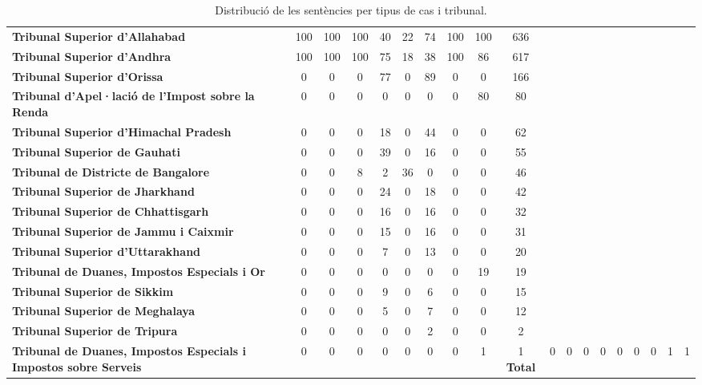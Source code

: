 \begin{table}[H]
\begin{tabular}{l|cccccccc|c}
    \textbf{Tribunal Superior d'Allahabad}                    & 100  & 100  & 100  & 40   & 22   & 74   & 100  & 100  & 636  \\
    \textbf{Tribunal Superior d'Andhra}                       & 100  & 100  & 100  & 75   & 18   & 38   & 100  & 86   & 617  \\
    \textbf{Tribunal Superior d'Orissa}                       & 0    & 0    & 0    & 77   & 0    & 89   & 0    & 0    & 166  \\
    \textbf{Tribunal d'Apel·lació de l'Impost sobre la Renda}           & 0    & 0    & 0    & 0    & 0    & 0    & 0    & 80   & 80   \\
    \textbf{Tribunal Superior d'Himachal Pradesh}             & 0    & 0    & 0    & 18   & 0    & 44   & 0    & 0    & 62   \\
    \textbf{Tribunal Superior de Gauhati}                      & 0    & 0    & 0    & 39   & 0    & 16   & 0    & 0    & 55   \\
    \textbf{Tribunal de Districte de Bangalore}                & 0    & 0    & 8    & 2    & 36   & 0    & 0    & 0    & 46   \\
    \textbf{Tribunal Superior de Jharkhand}                    & 0    & 0    & 0    & 24   & 0    & 18   & 0    & 0    & 42   \\
    \textbf{Tribunal Superior de Chhattisgarh}                  & 0    & 0    & 0    & 16   & 0    & 16   & 0    & 0    & 32   \\
    \textbf{Tribunal Superior de Jammu i Caixmir}             & 0    & 0    & 0    & 15   & 0    & 16   & 0    & 0    & 31   \\
    \textbf{Tribunal Superior d'Uttarakhand}                  & 0    & 0    & 0    & 7    & 0    & 13   & 0    & 0    & 20   \\
    \textbf{Tribunal de Duanes, Impostos Especials i Or}       & 0    & 0    & 0    & 0    & 0    & 0    & 0    & 19   & 19   \\
    \textbf{Tribunal Superior de Sikkim}                       & 0    & 0    & 0    & 9    & 0    & 6    & 0    & 0    & 15   \\
    \textbf{Tribunal Superior de Meghalaya}                 & 0    & 0    & 0    & 5    & 0    & 7    & 0    & 0    & 12   \\
    \textbf{Tribunal Superior de Tripura}                      & 0    & 0    & 0    & 0    & 0    & 2    & 0    & 0    & 2    \\
    \textbf{Tribunal de Duanes, Impostos Especials i Impostos sobre Serveis}  & 0    & 0    & 0    & 0    & 0    & 0    & 0    & 1    & 1   
    \hline
    \textbf{Total}                                   & 0    & 0    & 0    & 0    & 0    & 0    & 0    & 1    & 1   
  \end{tabular}
  \caption{Distribució de les sentències per tipus de cas i tribunal.}
  \label{tab:distribucio_cas_tribunal}
\end{table}  